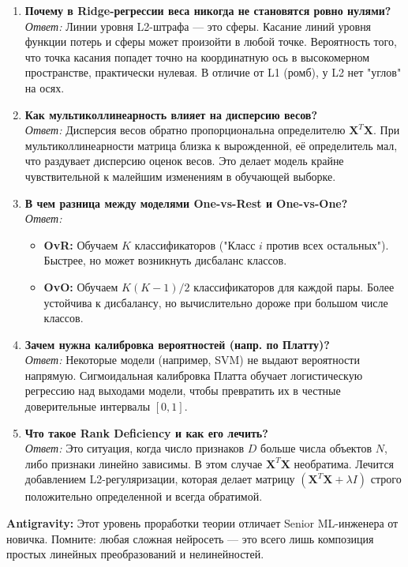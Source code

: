 \documentclass[12pt]{article}
\newcommand{\antigravity}[1]{{\small\color{antigravityblue}\textbf{Antigravity:} #1}}
\begin{document}
\begin{enumerate}[label=\textbf{Q\arabic*:}, leftmargin=1.5cm]
    \item \textbf{Почему в Ridge-регрессии веса никогда не становятся ровно нулями?} \\
    \textit{Ответ:} Линии уровня L2-штрафа — это сферы. Касание линий уровня функции потерь и сферы может произойти в любой точке. Вероятность того, что точка касания попадет точно на координатную ось в высокомерном пространстве, практически нулевая. В отличие от L1 (ромб), у L2 нет "углов" на осях.

    \item \textbf{Как мультиколлинеарность влияет на дисперсию весов?} \\
    \textit{Ответ:} Дисперсия весов обратно пропорциональна определителю $\mathbf{X}^T \mathbf{X}$. При мультиколлинеарности матрица близка к вырожденной, её определитель мал, что раздувает дисперсию оценок весов. Это делает модель крайне чувствительной к малейшим изменениям в обучающей выборке.

    \item \textbf{В чем разница между моделями One-vs-Rest и One-vs-One?} \\
    \textit{Ответ:} 
    \begin{itemize}
        \item \textbf{OvR:} Обучаем $K$ классификаторов ("Класс $i$ против всех остальных"). Быстрее, но может возникнуть дисбаланс классов.
        \item \textbf{OvO:} Обучаем $K(K-1)/2$ классификаторов для каждой пары. Более устойчива к дисбалансу, но вычислительно дороже при большом числе классов.
    \end{itemize}

    \item \textbf{Зачем нужна калибровка вероятностей (напр. по Платту)?} \\
    \textit{Ответ:} Некоторые модели (например, SVM) не выдают вероятности напрямую. Сигмоидальная калибровка Платта обучает логистическую регрессию над выходами модели, чтобы превратить их в честные доверительные интервалы $[0, 1]$.

    \item \textbf{Что такое Rank Deficiency и как его лечить?} \\
    \textit{Ответ:} Это ситуация, когда число признаков $D$ больше числа объектов $N$, либо признаки линейно зависимы. В этом случае $\mathbf{X}^T \mathbf{X}$ необратима. Лечится добавлением L2-регуляризации, которая делает матрицу $(\mathbf{X}^T \mathbf{X} + \lambda I)$ строго положительно определенной и всегда обратимой.
\end{enumerate}

\vspace{1cm}
\antigravity{Этот уровень проработки теории отличает Senior ML-инженера от новичка. Помните: любая сложная нейросеть — это всего лишь композиция простых линейных преобразований и нелинейностей.}
\end{document}

